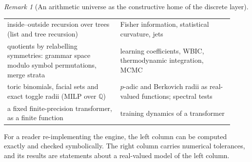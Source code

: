 \documentclass[11pt]{article}
\theoremstyle{definition}
\theoremstyle{remark}
\newtheorem{remark}[theorem]{Remark}
\begin{document}
\begin{remark}[An arithmetic universe as the constructive home of the discrete layer]
\begin{center}
\begin{tabular}{>{\raggedright\arraybackslash}p{0.46\linewidth}>{\raggedright\arraybackslash}p{0.46\linewidth}}
inside--outside recursion over trees (list and tree recursion) & Fisher information, statistical curvature, jets\\
quotients by relabelling symmetries: grammar space modulo symbol permutations, merge strata & learning coefficients, WBIC, thermodynamic integration, MCMC\\
toric binomials, facial sets and exact toggle radii (MILP over $\mathbb Q$) & $p$-adic and Berkovich radii as real-valued functions; spectral tests\\
a fixed finite-precision transformer, as a finite function & training dynamics of a transformer\\
\bottomrule
\end{tabular}
\end{center}
For a reader re-implementing the engine, the left column can be computed exactly and checked symbolically. The right column carries numerical tolerances, and its results are statements about a real-valued model of the left column.
\end{remark}
\end{document}
